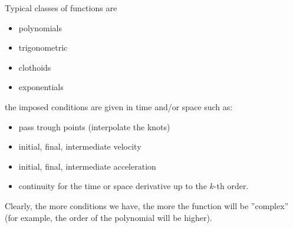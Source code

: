 \documentclass[10pt, letterpaper]{report}
\begin{document}
Typical classes of functions are\begin{itemize}
    \item polynomials
    \item trigonometric 
    \item clothoids 
    \item exponentials 
\end{itemize}
the imposed conditions are given in time and/or space such as:\begin{itemize}
    \item pass trough points (interpolate the knots)
    \item initial, final, intermediate velocity
    \item initial, final, intermediate acceleration 
    \item continuity for the time or space derivative up to the $k$-th order. 
\end{itemize}
Clearly, the more conditions we have, the more the function will be ''complex'' (for example, the order of the polynomial will be higher).
\end{document}
